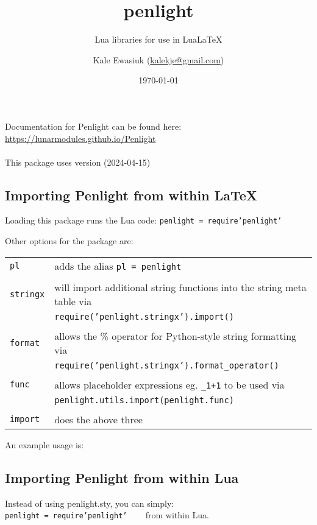 \documentclass[11pt,parskip=half]{scrartcl}
\author{Kale Ewasiuk (\url{kalekje@gmail.com})}
\date{\today}
\title{penlight}
\subtitle{Lua libraries for use in LuaLaTeX}
\newcommand{\cmd}[1]{\texttt{\detokenize{#1}}}
\begin{document}
\maketitle

    Documentation for Penlight can be found here:\\
\mbox{\url{https://lunarmodules.github.io/Penlight}}
\\\\ This package uses version \cmd{1.14.0} (2024-04-15)

\subsection*{Importing Penlight from within LaTeX}
Loading this package runs the Lua code:  \texttt{penlight = require'penlight'}

Other options for the package are:
\vspace{1em}

\hspace*{-6ex}\begin{tabular}{lp{4.8in}}
\texttt{pl} & adds the alias \texttt{pl = penlight}\\\\
\texttt{stringx} & will import additional string functions into the string meta table via\\
                &  \texttt{require('penlight.stringx').import()}\\\\
\texttt{format} & allows the \% operator for Python-style string formatting via\\
        & \texttt{require('penlight.stringx').format\_operator()}\\\\
\texttt{func} & allows placeholder expressions eg. \texttt{\_1+1} to be used via\\
            &   \texttt{penlight.utils.import(penlight.func)}\\\\
\texttt{import} & does the above three\\
\end{tabular}


An example usage is: \cmd{\usepackage[pl,import]{penlight}}


\subsection*{Importing Penlight from within Lua}
Instead of using penlight.sty, you can simply:\\
\texttt{penlight = require'penlight'} ~~~ from within Lua.
\end{document}
